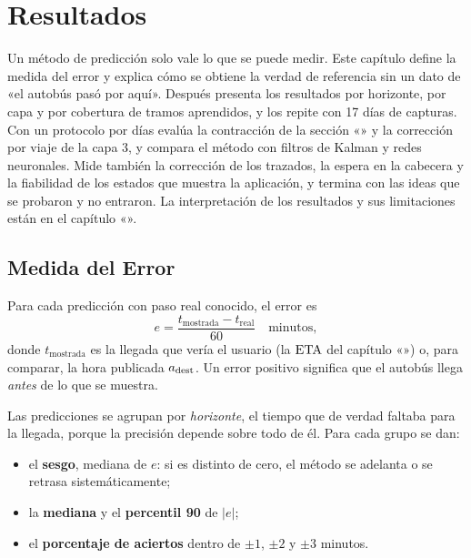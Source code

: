 \chapter{Resultados}
\label{cap:evaluacion}

Un método de predicción solo vale lo que se puede medir. Este capítulo define la medida del error y explica cómo se
obtiene la verdad de referencia sin un dato de «el autobús pasó por aquí». Después presenta los resultados por
horizonte, por capa y por cobertura de tramos aprendidos, y los repite con 17 días de capturas. Con un protocolo por
días evalúa la contracción de la sección «» y la corrección por viaje de la capa 3, y
compara el método con filtros de Kalman y redes neuronales. Mide también la corrección de los trazados, la espera en la
cabecera y la fiabilidad de los estados que muestra la aplicación, y termina con las ideas que se probaron y no
entraron. La interpretación de los resultados y sus limitaciones están en el capítulo «».

\section{Medida del Error}
\label{sec:medida}

Para cada predicción con paso real conocido, el error es
\begin{equation}
\label{eq:error}
e=\frac{t_{\mathrm{mostrada}}-t_{\mathrm{real}}}{60}\quad\text{minutos},
\end{equation}
donde $t_{\mathrm{mostrada}}$ es la llegada que vería el usuario (la $\mathrm{ETA}$ del capítulo «») o, para
comparar, la hora publicada $a_{\mathrm{dest}}$. Un error positivo significa que el autobús llega \emph{antes} de lo que se
muestra.

Las predicciones se agrupan por \emph{horizonte}, el tiempo que de verdad faltaba para la llegada, porque la
precisión depende sobre todo de él. Para cada grupo se dan:

\begin{itemize}
  \item el \textbf{sesgo}, mediana de $e$: si es distinto de cero, el método se adelanta o se retrasa sistemáticamente;
  \item la \textbf{mediana} y el \textbf{percentil 90} de $|e|$;
  \item el \textbf{porcentaje de aciertos} dentro de $\pm1$, $\pm2$ y $\pm3$ minutos.
\end{itemize}


